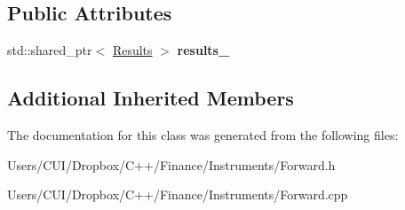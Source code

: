 \subsection*{Public Attributes}
\begin{DoxyCompactItemize}
\item 
\hypertarget{class_forward_abead12e748980177fb67f98bcffbf817}{}\label{class_forward_abead12e748980177fb67f98bcffbf817} 
std\+::shared\+\_\+ptr$<$ \hyperlink{class_forward_1_1_results}{Results} $>$ {\bfseries results\+\_\+}
\end{DoxyCompactItemize}
\subsection*{Additional Inherited Members}


The documentation for this class was generated from the following files\+:\begin{DoxyCompactItemize}
\item 
Users/\+C\+U\+I/\+Dropbox/\+C++/\+Finance/\+Instruments/Forward.\+h\item 
Users/\+C\+U\+I/\+Dropbox/\+C++/\+Finance/\+Instruments/Forward.\+cpp\end{DoxyCompactItemize}
